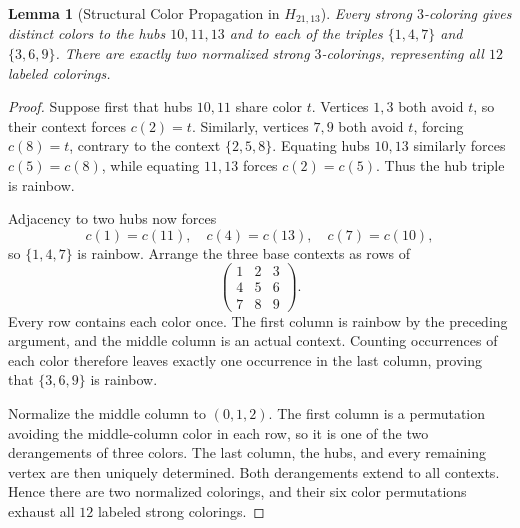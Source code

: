 \documentclass[aps,pra,reprint,superscriptaddress,longbibliography,nofootinbib,floatfix,10pt]{revtex4-2}
\newtheorem{lemma}[theorem]{Lemma}
\theoremstyle{definition}\newtheorem{definition}[theorem]{Definition}
\theoremstyle{remark}\newtheorem{remark}[theorem]{Remark}
\begin{document}
\begin{lemma}[Structural Color Propagation in $H_{21,13}$]\label{lem:H21-structural}
Every strong $3$-coloring gives distinct colors to the hubs $10,11,13$ and to each of the triples $\{1,4,7\}$ and $\{3,6,9\}$. There are exactly two normalized strong $3$-colorings, representing all $12$ labeled colorings.
\end{lemma}
\begin{proof}
Suppose first that hubs $10,11$ share color $t$. Vertices $1,3$ both avoid $t$, so their context forces $c(2)=t$. Similarly, vertices $7,9$ both avoid $t$, forcing $c(8)=t$, contrary to the context $\{2,5,8\}$. Equating hubs $10,13$ similarly forces $c(5)=c(8)$, while equating $11,13$ forces $c(2)=c(5)$. Thus the hub triple is rainbow.

Adjacency to two hubs now forces
\[
c(1)=c(11),\quad c(4)=c(13),\quad c(7)=c(10),
\]
so $\{1,4,7\}$ is rainbow. Arrange the three base contexts as rows of
\[
\begin{pmatrix}1&2&3\\4&5&6\\7&8&9\end{pmatrix}.
\]
Every row contains each color once. The first column is rainbow by the preceding argument, and the middle column is an actual context. Counting occurrences of each color therefore leaves exactly one occurrence in the last column, proving that $\{3,6,9\}$ is rainbow.

Normalize the middle column to $(0,1,2)$. The first column is a permutation avoiding the middle-column color in each row, so it is one of the two derangements of three colors. The last column, the hubs, and every remaining vertex are then uniquely determined. Both derangements extend to all contexts. Hence there are two normalized colorings, and their six color permutations exhaust all $12$ labeled strong colorings.
\end{proof}
\end{document}
